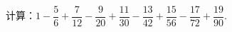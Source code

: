 计算：$1-\dfrac{5}{6}+\dfrac{7}{12}-\dfrac{9}{20}+\dfrac{11}{30}-\dfrac{13}{42}+\dfrac{15}{56}-
\dfrac{17}{72}+\dfrac{19}{90}$.